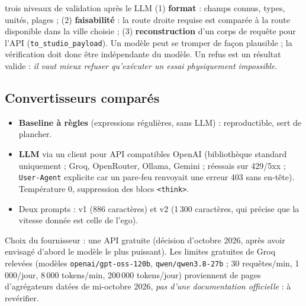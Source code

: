 \documentclass[11pt,a4paper]{article}
\providecommand{\og}{\guillemotleft\nobreakspace}
\providecommand{\fg}{\nobreakspace\guillemotright}
\newcommand{\code}[1]{\texttt{#1}}
\begin{document}
\begin{choix}{trois niveaux de validation apr\`es le LLM}
(1) \textbf{format} : champs connus, types, unit\'es, plages ; (2) \textbf{faisabilit\'e} : la route droite requise est compar\'ee \`a la route disponible dans la ville choisie ;
(3) \textbf{reconstruction} d'un corps de requ\^ete pour l'API (\code{to\_studio\_payload}). Un mod\`ele peut se tromper de fa\c con plausible ; la v\'erification doit donc \^etre ind\'ependante du mod\`ele.
Un refus est un r\'esultat valide : \emph{il vaut mieux refuser qu'ex\'ecuter un essai physiquement impossible}.
\end{choix}

\subsection{Convertisseurs compar\'es}
\begin{itemize}
\item \textbf{Baseline \`a r\`egles} (expressions r\'eguli\`eres, sans LLM) : reproductible, sert de plancher.
\item \textbf{LLM} via un client pour API \og compatibles OpenAI \fg{} (biblioth\`eque standard uniquement ; Groq, OpenRouter, Ollama, Gemini ; r\'eessais sur 429/5xx ; \code{User-Agent} explicite car un pare-feu renvoyait une erreur 403 \og 1010 \fg{} sans en-t\^ete).
      Temp\'erature 0, suppression des blocs \code{<think>}.
\item Deux prompts : v1 (886 caract\`eres) et v2 (1\,300 caract\`eres, qui pr\'ecise que la vitesse donn\'ee est celle de l'ego).
\end{itemize}
Choix du fournisseur : une API gratuite (d\'ecision d'octobre 2026, apr\`es avoir envisag\'e d'abord le mod\`ele le plus puissant). Les limites gratuites de Groq relev\'ees (mod\`eles \code{openai/gpt-oss-120b}, \code{qwen/qwen3.8-27b} ; 30 requ\^etes/min, 1\,000/jour,
8\,000 tokens/min, 200\,000 tokens/jour) proviennent de pages d'agr\'egateurs dat\'ees de mi-octobre 2026, \emph{pas d'une documentation officielle} : \`a rev\'erifier.
\end{document}
